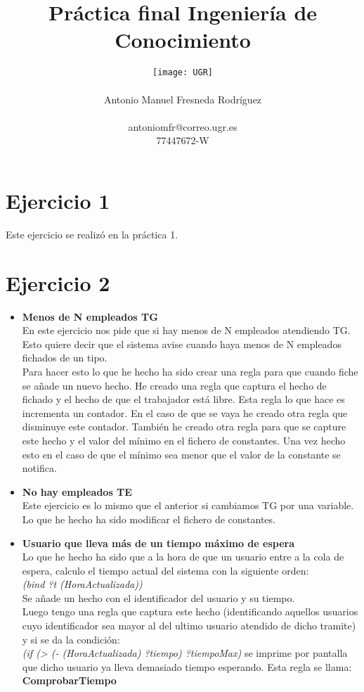 \documentclass[10pt,spanish]{article}
\author{
	\texttt{[image: UGR]} \\\\
	\Large 	Antonio Manuel Fresneda Rodríguez\\
	\\antoniomfr@correo.ugr.es
	\\77447672-W
	}
\date{}
\title{\huge \textbf{Práctica final Ingeniería de Conocimiento}}
\begin{document}
	\maketitle
	\pagebreak
	\tableofcontents
	\pagebreak
	\section{Ejercicio 1}
	Este ejercicio se realizó en la práctica 1.
	\section{Ejercicio 2}
	\begin{itemize}
		\item \textbf{Menos de N empleados TG}\\
		En este ejercicio nos pide que si hay menos de N empleados atendiendo TG. Esto quiere decir que el sistema avise cuando haya menos de N empleados fichados de un tipo. \\
		Para hacer esto lo que he hecho ha sido crear una regla para que cuando fiche se añade un nuevo hecho. He creado una regla que captura el hecho de fichado y el hecho de que el
		trabajador está libre. Esta regla lo que hace es incrementa un contador. En el caso de que se vaya he creado otra regla que disminuye este contador. También he creado otra regla para que se capture este hecho y el valor del mínimo en el fichero de constantes. Una vez hecho esto en el caso de que el mínimo sea menor que el valor de la constante
		se notifica.
		\item \textbf{No hay empleados TE}\\
		Este ejercicio es lo mismo que el anterior si cambiamos TG por una variable. Lo que he hecho ha sido modificar el fichero de constantes.
		\item \textbf{Usuario que lleva más de un tiempo máximo de espera}\\ Lo que he hecho ha sido que a la hora de que un usuario entre a la cola de espera, calculo el tiempo actual del sistema con la siguiente orden:\\ \textit{(bind ?t (HoraActualizada))
		}\\
		Se añade un hecho con el identificador del usuario y su tiempo. \\Luego tengo una regla que captura este hecho  (identificando aquellos usuarios cuyo identificador sea mayor al del ultimo usuario atendido de dicho tramite) y si se da la condición:\\ \textit{(if (> (- (HoraActualizada) ?tiempo) ?tiempoMax)} se imprime por pantalla que dicho usuario ya lleva demasiado tiempo esperando. Esta regla se llama: \textbf{ComprobarTiempo}

\end{itemize}
\end{document}
